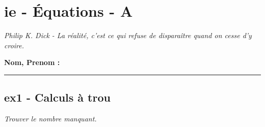 \documentclass[12pt]{article}
\newcommand{\horrule}[1]{\rule{\linewidth}{#1}} %
\begin{document}

\newtheorem{Definition}{Définition}
\newtheorem{Theorem}{Théorème}
\newtheorem{Proposition}{Propriété}

\renewcommand{\labelitemi}{$\bullet$}
\renewcommand{\labelitemii}{$\circ$}

\setlength{\columnseprule}{1pt}

\section*{ie - Équations - A}
\begin{center}
  \textit{Philip K. Dick - La réalité, c'est ce qui refuse de disparaître quand on cesse d'y croire.}
\end{center}
\textbf{Nom, Prenom :}\\
\horrule{2px}

\subsection*{ex1 - Calculs  à trou}
\textit{Trouver le nombre manquant.}
\end{document}

